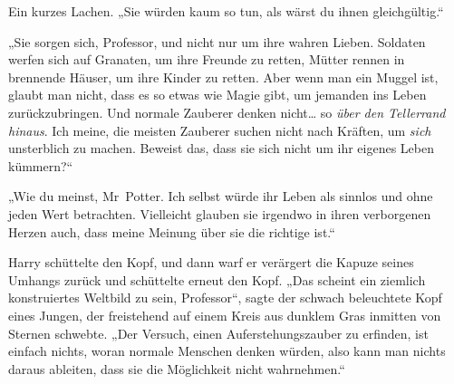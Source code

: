 Ein kurzes Lachen.
„Sie würden kaum so tun, als wärst du ihnen gleichgültig.“

„Sie sorgen sich, Professor, und nicht nur um ihre wahren Lieben. Soldaten werfen sich auf Granaten, um ihre Freunde zu retten, Mütter rennen in brennende Häuser, um ihre Kinder zu retten. Aber wenn man ein Muggel ist, glaubt man nicht, dass es so etwas wie Magie gibt, um jemanden ins Leben zurückzubringen. Und normale Zauberer denken nicht… so \emph{über den Tellerrand hinaus}. Ich meine, die meisten Zauberer suchen nicht nach Kräften, um \emph{sich} unsterblich zu machen. Beweist das, dass sie sich nicht um ihr eigenes Leben kümmern?“

„Wie du meinst, Mr~Potter. Ich selbst würde ihr Leben als sinnlos und ohne jeden Wert betrachten. Vielleicht glauben sie irgendwo in ihren verborgenen Herzen auch, dass meine Meinung über sie die richtige ist.“

Harry schüttelte den Kopf, und dann warf er verärgert die Kapuze seines Umhangs zurück und schüttelte erneut den Kopf. „Das scheint ein ziemlich konstruiertes Weltbild zu sein, Professor“, sagte der schwach beleuchtete Kopf eines Jungen, der freistehend auf einem Kreis aus dunklem Gras inmitten von Sternen schwebte. „Der Versuch, einen Auferstehungszauber zu erfinden, ist einfach nichts, woran normale Menschen denken würden, also kann man nichts daraus ableiten, dass sie die Möglichkeit nicht wahrnehmen.“

